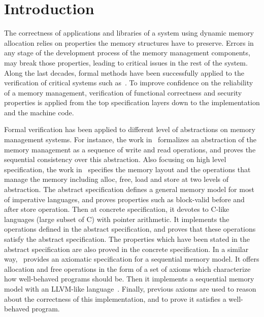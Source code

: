 \section{Introduction}
The correctness of applications and libraries of a system using dynamic memory allocation relies on properties the memory structures have to preserve. Errors in any stage of the development process of the memory management components, may break those properties, leading to critical issues in the rest of the system. Along the last decades, formal methods have been successfully applied to the verification of critical systems such as~\cite{reg_rushby, reg_luu}. To improve confidence on the reliability of a memory management, verification of functional correctness and security properties is applied from the top specification layers down to the implementation and the machine code.

Formal verification has been applied to different level of abstractions on memory management systems. For instance, the work in~\cite{reg_higham} formalizes an abstraction of the memory management as a sequence of write and read operations, and proves the sequential consistency over this abstraction. Also focusing on high level specification, the work in~\cite{reg_blazy} specifies the memory layout and the operations that manage the memory including alloc, free, load and store at two levels of abstraction. The abstract specification defines a general memory model for most of imperative languages, and proves properties such as block-valid before and after store operation. Then at concrete specification, it devotes to C-like languages (large subset of C) with pointer arithmetic. It implements the operations defined in the abstract specification, and proves that these operations satisfy the abstract specification. The properties which have been stated in the abstract specification are also proved in the concrete specification. In a similar way,~\cite{reg_mansky} provides an axiomatic specification for a sequential memory model. It offers allocation and free operations in the form of a set of axioms which characterize how well-behaved programs should be. Then it implements a sequential memory model with an LLVM-like language~\cite{reg_chris}. Finally, previous axioms are used to reason about the correctness of this implementation, and to prove it satisfies a well-behaved program.


